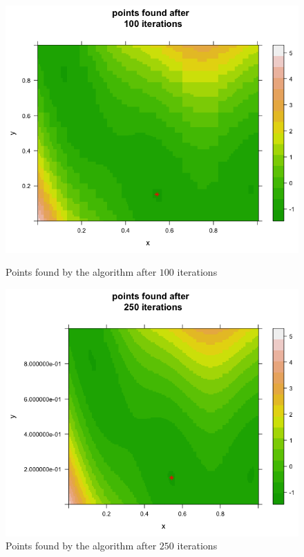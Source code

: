 \begin{figure}[!htb]
    \centering
    \begin{minipage}{.5\textwidth}
        \centering
        \includegraphics[width=1.064\linewidth, height=0.32\textheight]{gfx/chapter-bayesianrvfl/min_branin_100_iter.png}
        \caption{Points found by the algorithm after $100$ iterations}
        \label{min_branin_100_iter}
    \end{minipage}%
    \begin{minipage}{0.5\textwidth}
        \centering
        \includegraphics[width=1.064\linewidth, height=0.32\textheight]{gfx/chapter-bayesianrvfl/min_branin_250_iter.png}
        \caption{Points found by the algorithm after $250$ iterations}
        \label{min_branin_250_iter}
    \end{minipage}
\end{figure}

